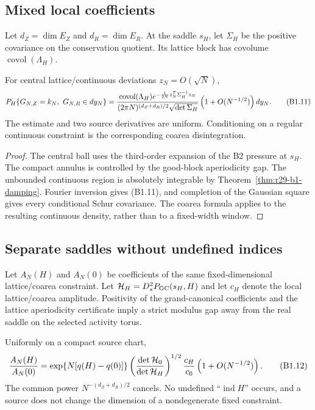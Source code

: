 \subsection{Mixed local coefficients}

Let $d_Z=\dim E_Z$ and $d_R=\dim E_R$.  At the saddle $s_H$, let
$\Sigma_H$ be the positive covariance on the conservation quotient.  Its
lattice block has covolume $\operatorname{covol}(\Lambda_H)$.

\begin{theorem}
\label{thm:r29-b1-llt}
For central lattice/continuous deviations $z_N=O(\sqrt N)$,
\[
 P_H\{G_{N,Z}=k_N,\ G_{N,R}\in dy_N\}
 ={\operatorname{covol}(\Lambda_H)
   e^{-\frac1{2N}z_N^T\Sigma_H^{-1}z_N}
  \over(2\pi N)^{(d_Z+d_R)/2}\sqrt{\det\Sigma_H}}
 \left(1+O(N^{-1/2})\right)dy_N.                          \tag{B1.11}
\]
The estimate and two source derivatives are uniform.  Conditioning on a
regular continuous constraint is the corresponding coarea disintegration.
\end{theorem}

\begin{proof}
The central ball uses the third-order expansion of the B2 pressure at $s_H$.
The compact annulus is controlled by the good-block aperiodicity gap.  The
unbounded continuous region is absolutely integrable by
Theorem~\ref{thm:r29-b1-damping}.  Fourier inversion gives (B1.11), and
completion of the Gaussian square gives every conditional Schur covariance.
The coarea formula applies to the resulting continuous density, rather than to
a fixed-width window.
\end{proof}

\subsection{Separate saddles without undefined indices}

Let $A_N(H)$ and $A_N(0)$ be coefficients of the same fixed-dimensional
lattice/coarea constraint.  Let $\mathcal H_H=D_s^2P_{\rm GC}(s_H,H)$ and let
$c_H$ denote the local lattice/coarea amplitude.  Positivity of the
grand-canonical coefficients and the lattice aperiodicity certificate imply a
strict modulus gap away from the real saddle on the selected activity torus.

\begin{theorem}
\label{thm:r29-b1-ratio}
Uniformly on a compact source chart,
\[
 {A_N(H)\over A_N(0)}
 =\exp\{N[q(H)-q(0)]\}
   \left({\det\mathcal H_0\over\det\mathcal H_H}\right)^{1/2}
   {c_H\over c_0}\left(1+O(N^{-1/2})\right).              \tag{B1.12}
\]
The common power $N^{-(d_Z+d_R)/2}$ cancels.  No undefined
``$\operatorname{ind}H$'' occurs, and a source does not change the dimension
of a nondegenerate fixed constraint.
\end{theorem}


